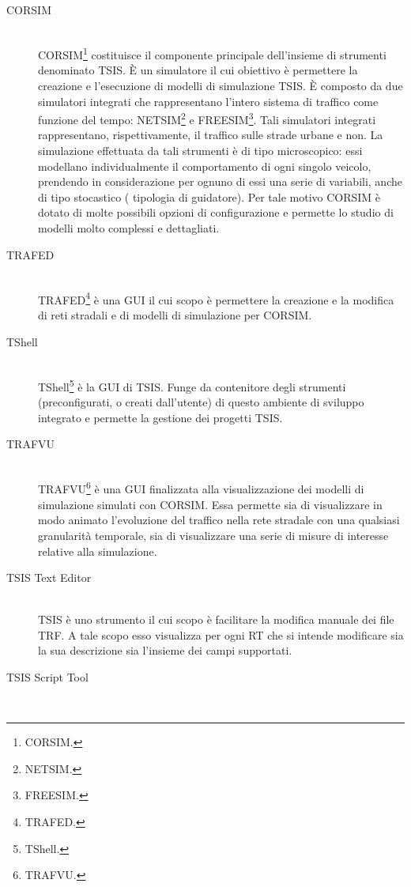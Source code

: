 \begin{description}
    \item[CORSIM] \hfill \\
    \acs{CORSIM}\footnote{\acf{CORSIM}.} costituisce il componente principale dell'insieme di strumenti denominato \acs{TSIS}. È un simulatore il cui obiettivo è permettere la creazione e l'esecuzione di modelli di simulazione \acs{TSIS}. È composto da due simulatori integrati che rappresentano l'intero sistema di traffico come funzione del tempo: \acs{NETSIM}\footnote{\acf{NETSIM}.} e \acs{FREESIM}\footnote{\acf{FREESIM}.}. Tali simulatori integrati rappresentano, rispettivamente, il traffico sulle strade urbane e non. La simulazione effettuata da tali strumenti è di tipo microscopico: essi modellano individualmente il comportamento di ogni singolo veicolo, prendendo in considerazione per ognuno di essi una serie di variabili, anche di tipo stocastico (\eg{} tipologia di guidatore). Per tale motivo \acs{CORSIM} è dotato di molte possibili opzioni di configurazione e permette lo studio di modelli molto complessi e dettagliati.
    \item[TRAFED] \hfill \\
    \acs{TRAFED}\footnote{\acf{TRAFED}.} è una \acs{GUI} il cui scopo è permettere la creazione e la modifica di reti stradali e di modelli di simulazione per \acs{CORSIM}.
    \item[TShell] \hfill \\
    \acs{TShell}\footnote{\acf{TShell}.} è la \acs{GUI} di \acs{TSIS}. Funge da contenitore degli strumenti (preconfigurati, o creati dall'utente) di questo ambiente di sviluppo integrato e permette la gestione dei progetti \acs{TSIS}.
    \item[TRAFVU] \hfill \\
    \acs{TRAFVU}\footnote{\acf{TRAFVU}.} è una \acs{GUI} finalizzata alla visualizzazione dei modelli di simulazione simulati con \acs{CORSIM}. Essa permette sia di visualizzare in modo animato l'evoluzione del traffico nella rete stradale con una qualsiasi granularità temporale, sia di visualizzare una serie di misure di interesse relative alla simulazione.
    \item[TSIS Text Editor] \hfill \\
    \acs{TSIS}  è uno strumento il cui scopo è facilitare la modifica manuale dei file \acs{TRF}. A tale scopo esso visualizza per ogni \acs{RT} che si intende modificare sia la sua descrizione sia l'insieme dei campi supportati.
    \item[TSIS Script Tool] \hfill \\

\end{description}

